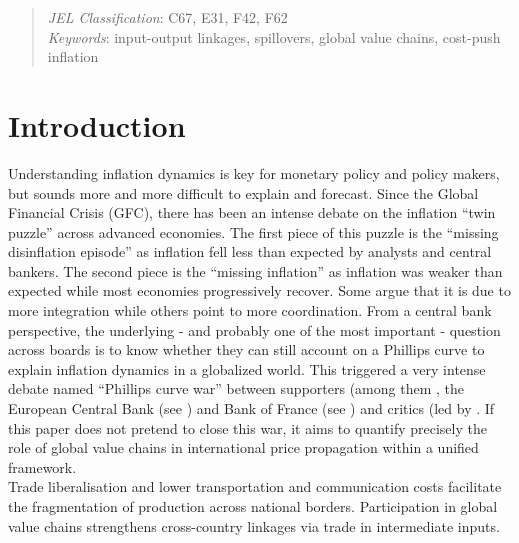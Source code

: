 \documentclass[11pt,a4paper]{article}
\begin{document}
\begin{abstract}
{\small \bigskip \noindent \emph{JEL Classification}\/: C67, E31, F42, F62\\}
{\small \noindent \emph{Keywords}\/: input-output linkages, spillovers, global value chains, cost-push inflation \\ }
\end{abstract}

\section{Introduction}



Understanding inflation dynamics is key for monetary policy and policy makers, but sounds more and more difficult to explain and forecast. Since the Global Financial Crisis (GFC), there has been an intense debate on the inflation “twin puzzle” across advanced economies. The first piece of this puzzle is the “missing disinflation episode” as inflation fell less than expected by analysts and central bankers. The second piece is the “missing inflation” as inflation was weaker than expected while most economies progressively recover. Some argue that it is due to more integration while others point to more coordination. From a central bank perspective, the underlying - and probably one of the most important - question across boards is to know whether they can still account on a Phillips curve to explain inflation dynamics in a globalized world. This triggered a very intense debate named “Phillips curve war” between supporters (among them \cite{Blanchard2016}, the European Central Bank (see \cite{Eser2020}) and Bank of France (see \cite{Berson2018}) and critics (led by \cite{Farmer2018}. If this paper does not pretend to close this war, it aims to quantify precisely the role of global value chains in international price propagation within a unified framework. 
\\
Trade liberalisation and lower transportation and communication costs facilitate the fragmentation of production across national borders.
Participation in global value chains strengthens cross-country linkages via trade in intermediate inputs.
\end{document}
